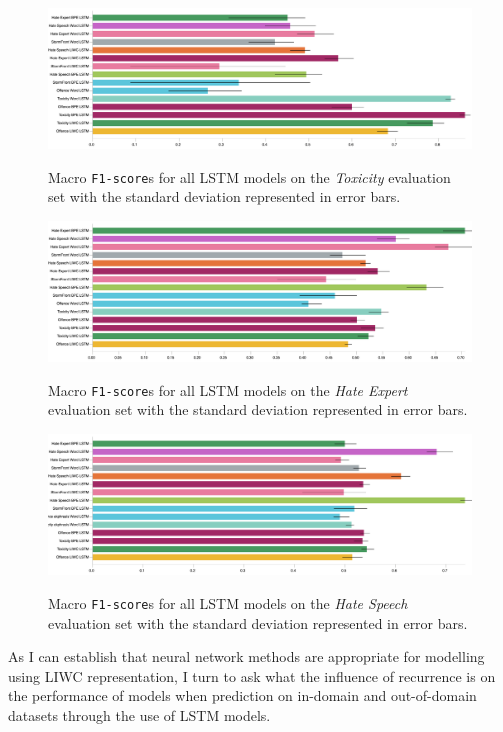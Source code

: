 \begin{figure}
\begin{minipage}{\textwidth}
    \centering
    \includegraphics[width=\textwidth]{all_lstm_wulczyn_test.pdf}
    \caption{Macro \texttt{F1-score}s for all LSTM models on the \textit{Toxicity} evaluation set with the standard deviation represented in error bars.}
    \label{fig:wulczyn_lstm_test}
  \vfill
    \includegraphics[width=\textwidth]{all_lstm_waseem_test.pdf}
    \caption{Macro \texttt{F1-score}s for all LSTM models on the \textit{Hate Expert} evaluation set with the standard deviation represented in error bars.}
    \label{fig:waseem_lstm_test}
    \vfill
    \includegraphics[width=\textwidth]{all_lstm_waseem_hovy_test.pdf}
    \caption{Macro \texttt{F1-score}s for all LSTM models on the \textit{Hate Speech} evaluation set with the standard deviation represented in error bars.}
  \label{fig:waseem_hovy_lstm_test}  
\end{minipage}
\end{figure}

As I can establish that neural network methods are appropriate for modelling using LIWC representation, I turn to ask what the influence of recurrence is on the performance of models when prediction on in-domain and out-of-domain datasets through the use of LSTM models.

